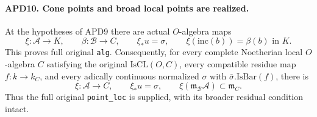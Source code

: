 \paragraph{APD10. Cone points and broad local points are realized.}
\label{claim:APD10}
At the hypotheses of APD9 there are actual \(O\)-algebra maps
\[
 \xi:\mathcal A\longrightarrow K,
 \qquad\beta:\mathcal B\longrightarrow C,
 \qquad \xi_*u=\sigma,\qquad
 \xi(\mathrm{inc}(b))=\beta(b)\text{ in }K.                \tag{APD.20}
\]
This proves full original \texttt{alg}.  Consequently, for every
complete Noetherian local \(O\)-algebra \(C\) satisfying the
original \(\mathrm{IsCL}(O,C)\), every compatible residue map
\(f:k\to k_C\), and every adically continuous normalized
\(\sigma\) with \(\bar\sigma.\mathrm{IsBar}(f)\), there is
\[
 \xi:\mathcal A\longrightarrow C,
 \qquad \xi_*u=\sigma,
 \qquad \xi(\mathfrak m_{\mathcal B}\mathcal A)
                                  \subset\mathfrak m_C. \tag{APD.21}
\]
Thus the full original \texttt{point\_loc} is supplied, with its
broader residual condition intact.

